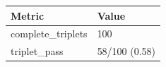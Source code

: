 \begin{tabular}{ll}
\hline
Metric & Value \\
\hline
complete\_triplets & 100 \\
triplet\_pass & 58/100 (0.58) \\
\hline
\end{tabular}
